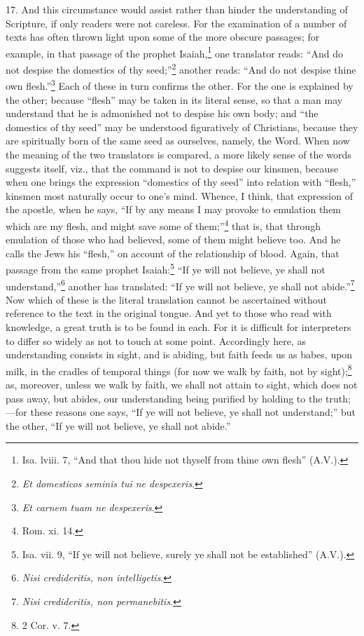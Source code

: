 17. And this circumstance would assist rather than hinder the understanding of Scripture, if only readers were not careless. For the examination of a number of texts has often thrown light upon some of the more obscure passages; for example, in that passage of the prophet Isaiah,\footnote{Isa. lviii. 7, “And that thou hide not thyself from thine own flesh” (A.V.).} one translator reads: “And do not despise the domestics of thy seed;”\footnote{\emph{Et domesticos seminis tui ne despexeris}.} another reads: “And do not despise thine own flesh.”\footnote{\emph{Et carnem tuam ne despexeris}.} Each of these in turn confirms the other. For the one is explained by the other; because “flesh” may be taken in its literal sense, so that a man may understand that he is admonished not to despise his own body; and “the domestics of thy seed” may be understood figuratively of Christians, because they are spiritually born of the same seed as ourselves, namely, the Word. When now the meaning of the two translators is compared, a more likely sense of the words suggests itself, viz., that the command is not to despise our kinsmen, because when one brings the expression “domestics of thy seed” into relation with “flesh,” kinsmen most naturally occur to one’s mind. Whence, I think, that expression of the apostle, when he says, “If by any means I may provoke to emulation them which are my flesh, and might save some of them;”\footnote{Rom. xi. 14.} that is, that through emulation of those who had believed, some of them might believe too. And he calls the Jews his “flesh,” on account of the relationship of blood. Again, that passage from the same prophet Isaiah:\footnote{Isa. vii. 9, “If ye will not believe, surely ye shall not be established” (A.V.).} “If ye will not believe, ye shall not understand,”\footnote{\emph{Nisi credideritis, non intelligetis}.} another has translated: “If ye will not believe, ye shall not abide.”\footnote{\emph{Nisi credideritis, non permanebitis}.} Now which of these is the literal translation cannot be ascertained without reference to the text in the original tongue. And yet to those who read with knowledge, a great truth is to be found in each. For it is difficult for interpreters to differ so widely as not to touch at some point. Accordingly here, as understanding consists in sight, and is abiding, but faith feeds us as babes, upon milk, in the cradles of temporal things (for now we walk by faith, not by sight);\footnote{2 Cor. v. 7.} as, moreover, unless we walk by faith, we shall not attain to sight, which does not pass away, but abides, our understanding being purified by holding to the truth;—for these reasons one says, “If ye will not believe, ye shall not understand;” but the other, “If ye will not believe, ye shall not abide.”

